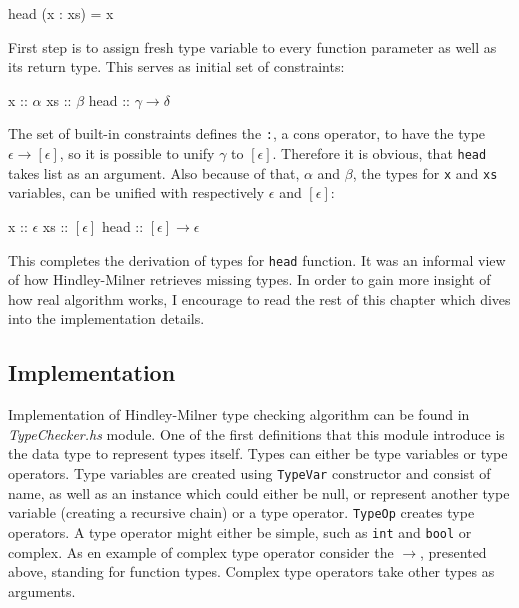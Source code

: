 \documentclass[12pt,a4paper]{report}
\begin{document}
\vspace*{0.2in}
\begin{code}[style=haskell]
  head (x : xs) = x
\end{code}

First step is to assign fresh type variable to every function parameter as
well as its return type. This serves as initial set of constraints:

\vspace*{0.2in}
\begin{code}[mathescape=true,style=haskell]
  x :: $\alpha$
  xs :: $\beta$
  head :: $\gamma \rightarrow \delta$
\end{code}

The set of built-in constraints defines the \texttt{:}, a cons operator, to
have the type $\epsilon \rightarrow [\epsilon]$, so it is possible to unify
$\gamma$ to $[\epsilon]$. Therefore it is obvious, that \texttt{head} takes
list as an argument. Also because of that, $\alpha$ and $\beta$, the types for
\texttt{x} and \texttt{xs} variables, can be unified with respectively
$\epsilon$ and $[\epsilon]$:

\vspace*{0.2in}
\begin{code}[mathescape=true,style=haskell]
  x :: $\epsilon$
  xs :: $[\epsilon]$
  head :: $[\epsilon] \rightarrow \epsilon$
\end{code}

This completes the derivation of types for \texttt{head} function. It was an
informal view of how Hindley-Milner retrieves missing types. In order to gain
more insight of how real algorithm works, I encourage to read the rest of this
chapter which dives into the implementation details.

\subsection{Implementation}
Implementation of Hindley-Milner type checking algorithm can be found in
\textit{TypeChecker.hs} module. One of the first definitions that this module
introduce is the data type to represent types itself. Types can either be type
variables or type operators. Type variables are created using \texttt{TypeVar}
constructor and consist of name, as well as an instance which could either be
null, or represent another type variable (creating a recursive chain) or a type
operator. \texttt{TypeOp} creates type operators. A type operator might either
be simple, such as \texttt{int} and \texttt{bool} or complex. As en example of
complex type operator consider the $\rightarrow$, presented above, standing for
function types. Complex type operators take other types as arguments.
\end{document}
